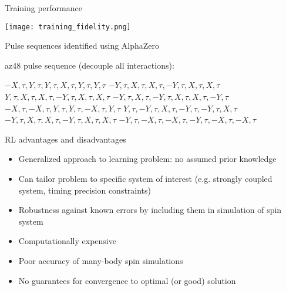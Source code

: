 \documentclass{beamer}
\begin{document}
\begin{frame}{Training performance}

\texttt{[image: training\_fidelity.png]}
\end{frame}

\begin{frame}{Pulse sequences identified using AlphaZero}

\textrm{az48} pulse sequence (decouple all interactions):

$ -X, \tau, Y, \tau, Y, \tau, X, \tau, Y, \tau, Y, \tau $
$ -Y, \tau, X, \tau, X, \tau, -Y, \tau, X, \tau, X, \tau $
$ Y, \tau, X, \tau, X, \tau, -Y, \tau, X, \tau, X, \tau $
$ -Y, \tau, X, \tau, -Y, \tau, X, \tau, X, \tau, -Y, \tau $
$ -X, \tau, -X, \tau, Y, \tau, Y, \tau, -X, \tau, Y, \tau $
$ Y, \tau, -Y, \tau, X, \tau, -Y, \tau, -Y, \tau, X, \tau $
$ -Y, \tau, X, \tau, X, \tau, -Y, \tau, X, \tau, X, \tau $
$ -Y, \tau, -X, \tau, -X, \tau, -Y, \tau, -X, \tau, -X, \tau $

\end{frame}

\begin{frame}{RL advantages and disadvantages}

\begin{itemize}
    \item Generalized approach to learning problem: no assumed prior knowledge
    \item Can tailor problem to specific system of interest (e.g. strongly coupled system, timing precision constraints)
    \item Robustness against known errors by including them in simulation of spin system
\end{itemize}

\pause

\begin{itemize}
    \color{red}
    \item Computationally expensive
    \item Poor accuracy of many-body spin simulations
    \item No guarantees for convergence to optimal (or good) solution
\end{itemize}

\end{frame}
\end{document}
